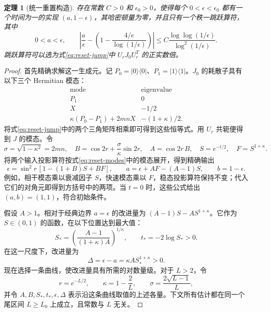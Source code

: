 \documentclass[UTF8,11pt,a4paper,fontset=fandol]{ctexart}
\newtheorem{theorem}{定理}[section]
\theoremstyle{definition}
\theoremstyle{remark}
\begin{document}
\begin{theorem}[统一重置构造]\label{thm:reset}
存在常数 \(C>0\) 和 \(\epsilon_0>0\)，使得每个 \(0<\epsilon<\epsilon_0\) 都有一个时间为一的实现 \((a,1-\epsilon)\)，其哈密顿量为零，并且只有一个秩一跳跃算符，其中
\begin{equation}\label{eq:reset-remainder}
 0<a<\epsilon,\qquad
 \left|\frac a\epsilon-\left(1-\frac{4/e}{\log(1/\epsilon)}\right)\right|
 \leq C\frac{\log\log(1/\epsilon)}{\log^2(1/\epsilon)}.
\end{equation}
跳跃算符可以选为式\eqref{eq:reset-jump}中 \(U_rJ_0U_r^T\) 的正实数倍。
\end{theorem}
\begin{proof}
首先精确求解这一生成元。记 \(P_0=|0\rangle\langle0|\)、\(P_1=|1\rangle\langle1|\)。\(J_0\) 的耗散子具有以下三个 Hermitian 模态：
\begin{equation}\label{eq:reset-modes}
 \begin{array}{c|c}
 \text{mode}&\text{eigenvalue}\\ \hline
 P_1&0\\
 X&-1/2\\
 \kappa(P_0-P_1)+2mnX&-(1+\kappa)/2.
 \end{array}
\end{equation}
将式\eqref{eq:reset-jump}中的两个三角矩阵相乘即可得到这些恒等式。用 \(U_r\) 共轭便得到 \(J\) 的模态。令
\begin{equation}\label{eq:reset-coefficients}
 \sigma=\sqrt{1-\kappa^2}=2mn,\quad
 B=\cos2r+\frac\sigma\kappa\sin2r,\quad A=\cos2r\,B,
 \quad S=e^{-t/2},\quad F=S^{1+\kappa}.
\end{equation}
将两个输入投影算符按式\eqref{eq:reset-modes}中的模态展开，得到精确输出
\begin{equation}\label{eq:reset-output}
 \epsilon=\sin^2r\,[1-(1+B)S+BF],\qquad
 a=\epsilon+AF-(A-1)S,\qquad b=1-\epsilon.
\end{equation}
例如，相干模态乘以衰减因子 \(S\)，快速模态乘以 \(F\)，稳态投影算符保持不变；代入它们的对角元即得到方括号中的两项。当 \(t=0\) 时，这些公式给出 \((a,b)=(1,1)\)，符合初始条件。

假设 \(A>1\)。相对于经典边界 \(a=\epsilon\) 的改进量为 \((A-1)S-AS^{1+\kappa}\)。它作为 \(S\in(0,1)\) 的函数，在以下位置达到最大值：
\begin{equation}\label{eq:optimal-reset-scale}
 S_* =\left(\frac{A-1}{(1+\kappa)A}\right)^{1/\kappa},
 \qquad t_*=-2\log S_*>0.
\end{equation}
在这一尺度下，改进量为
\begin{equation}\label{eq:reset-gain}
 \Delta=\epsilon-a=\kappa A S_*^{1+\kappa}>0.
\end{equation}
现在选择一条曲线，使改进量具有所需的对数量级。对于 \(L>2\)，令
\begin{equation}\label{eq:reset-schedule}
 r=e^{-L/2},\qquad \kappa=1-\frac2L,
 \qquad \sigma=\frac{2\sqrt{L-1}}L,
\end{equation}
并令 \(A,B,S_*,t_*,\epsilon,\Delta\) 表示沿这条曲线取值的上述各量。下文所有估计都在同一个尾区间 \(L\geq L_0\) 上成立，且常数与 \(L\) 无关。


\end{proof}
\end{document}
